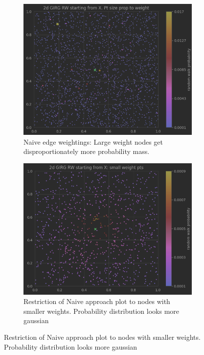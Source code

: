 \begin{figure}
  \centering

  \begin{subfigure}{0.49\textwidth}
    \centering
    \includegraphics[width=\linewidth]{figures/2d_GIRG_RW.png}
    \caption{Naive edge weightings: Large weight nodes get disproportionately more probability mass.}
  \end{subfigure}
  \hfill
  \begin{subfigure}{0.49\textwidth}
    \centering
    \includegraphics[width=\linewidth]{figures/2d_GIRG_RW_small_weights.png}
    \caption{Restriction of Naive approach plot to nodes with smaller weights. Probability distribution looks more gaussian}
  \end{subfigure}


\end{figure}
